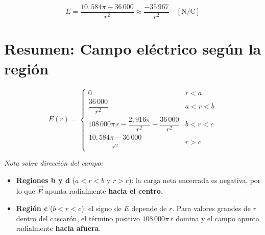 \documentclass[12pt,letterpaper]{article}
\begin{document}
\[
    \boxed{E = \frac{10{,}584\pi - 36\,000}{r^2}
              \approx \frac{-35\,967}{r^2} \quad [\text{N/C}]}
\]

\section*{Resumen: Campo el\'ectrico seg\'un la regi\'on}

\[
E(r) =
\begin{cases}
    0
        & r < a \\[10pt]
    \dfrac{36\,000}{r^2}
        & a < r < b \\[10pt]
    108\,000\pi\, r - \dfrac{2{,}916\pi}{r^2} - \dfrac{36\,000}{r^2}
        & b < r < c \\[10pt]
    \dfrac{10{,}584\pi - 36\,000}{r^2}
        & r > c
\end{cases}
\]

\medskip
\noindent\textit{Nota sobre direcci\'on del campo:}
\begin{itemize}
    \item \textbf{Regiones b y d} ($a < r < b$ y $r > c$): la carga neta encerrada es
          negativa, por lo que $\vec{E}$ apunta radialmente \textbf{hacia el centro}.
    \item \textbf{Regi\'on c} ($b < r < c$): el signo de $E$ depende de $r$. Para valores
          grandes de $r$ dentro del cascar\'on, el t\'ermino positivo $108\,000\pi\,r$
          domina y el campo apunta radialmente \textbf{hacia afuera}.
\end{itemize}
\end{document}
